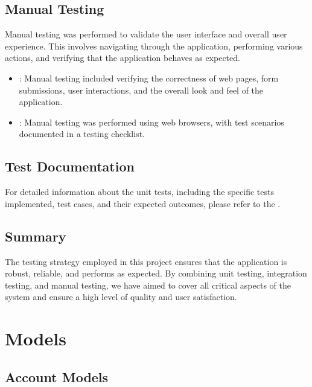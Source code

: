 \documentclass[letterpaper,10pt,english]{sphinxmanual}
\begin{document}
\section{Manual Testing}
\label{\detokenize{modules/testing:manual-testing}}
\sphinxAtStartPar
Manual testing was performed to validate the user interface and overall user experience. This involves navigating through the application, performing various actions, and verifying that the application behaves as expected.
\begin{itemize}
\item {} 
\sphinxAtStartPar
{}: Manual testing included verifying the correctness of web pages, form submissions, user interactions, and the overall look and feel of the application.

\item {} 
\sphinxAtStartPar
{}: Manual testing was performed using web browsers, with test scenarios documented in a testing checklist.

\end{itemize}


\section{Test Documentation}
\label{\detokenize{modules/testing:test-documentation}}
\sphinxAtStartPar
For detailed information about the unit tests, including the specific tests implemented, test cases, and their expected outcomes, please refer to the .


\section{Summary}
\label{\detokenize{modules/testing:summary}}
\sphinxAtStartPar
The testing strategy employed in this project ensures that the application is robust, reliable, and performs as expected. By combining unit testing, integration testing, and manual testing, we have aimed to cover all critical aspects of the system and ensure a high level of quality and user satisfaction.

\sphinxstepscope


\chapter{Models}
\label{\detokenize{modules/models:models}}\label{\detokenize{modules/models::doc}}

\section{Account Models}
\label{\detokenize{modules/models:module-account.models}}\label{\detokenize{modules/models:account-models}}
\end{document}

